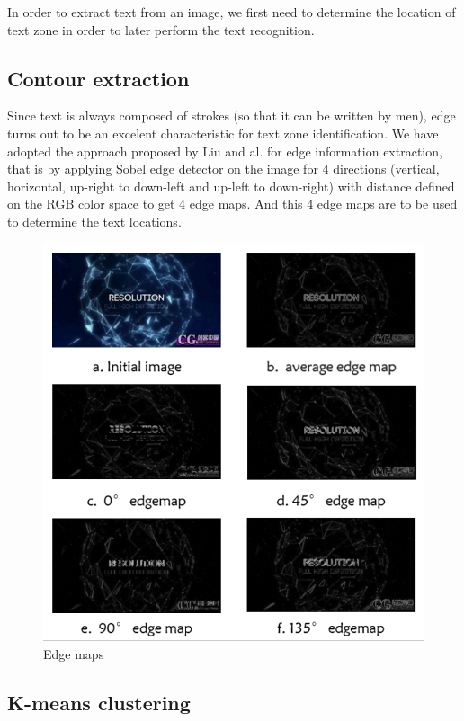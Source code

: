 \documentclass[paper=a4, french, 11pt]{scrartcl}
\begin{document}
In order to extract text from an image, we first need to determine the location of text zone in order to later perform the text recognition.  

\subsection{Contour extraction} \mbox{} \vspace{-0.5cm}

Since text is always composed of strokes (so that it can be written by men), edge turns out to be an excelent characteristic for text zone identification. We have adopted the approach proposed by Liu and al. for edge information extraction, that is by applying Sobel edge detector on the image for 4 directions (vertical, horizontal, up-right to down-left and up-left to down-right) with distance defined on the RGB color space to get 4 edge maps. And this 4 edge maps are to be used to determine the text locations.

\begin{figure}[h]
\begin{center}
	\vspace{-1ex}
   \includegraphics[width=0.75\linewidth]{edge_filter_example.png}
\end{center}
\vspace{-4ex}
\caption{Edge maps}
\label{fig:heatmap}
\end{figure}

\subsection{K-means clustering} \mbox{} \vspace{-0.5cm}
\end{document}

